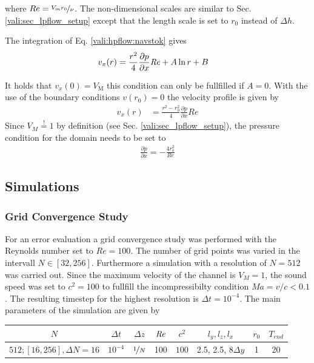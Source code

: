 where $Re = \nicefrac{V_{m}r_0}{\nu}$.
The non-dimensional scales are similar to Sec. \ref{vali:sec_lpflow_setup}  except that the length scale is set to $r_0$ instead of $\Delta h$.

The integration of Eq. \ref{vali:hpflow:navstok} gives
\begin{align}
    v_x(r) &= \frac{r^2}{4}\frac{\partial p}{\partial x}\mbox{\textit{Re}} + A \ln r + B
\end{align}

It holds that $v_x(0)= V_{\text{M}}$ this condition can only be fullfilled if $A=0$.
With the use of the boundary conditions $v(r_0) = 0$ the velocity profile is given by
\begin{align}
    v_x(r) &= \frac{r^2 - r_0^2}{4}\frac{\partial p}{\partial x}Re
\end{align}
Since $V_{M} \stackrel{!}{=} 1$ by definition (see Sec. \ref{vali:sec_lpflow_setup}),
 the pressure condition for the domain needs to be set to
\begin{align}
    \frac{\partial p}{\partial x} = -\frac{4 r_o^2}{Re}
\end{align}

\subsection{Simulations}
\label{vali:hpflow_simsetups}

\subsubsection{Grid Convergence Study}

For an error evaluation a grid convergence study was performed with the Reynolds number set to $Re=100$.
The number of grid points was varied in the intervall $N\in[32, 256]$. Furthermore a
simulation with a resolution of $N=512$ was carried out.
Since the maximum velocity of the channel is $V_{M}=1$,
the sound speed was set to $c^2 = 100$ to fullfill the incompressibilty condition $Ma = v/c < 0.1$.
The resulting timestep for the highest resolution is $\Delta t = 10^{-4}$.
The main parameters of the simulation are  given by

\begin{center}
\vspace*{0.7ex}
\begin{tabular}{c|c|c|c|c|c|c|c }
 $ N  $                   & $\Delta t$ & $\Delta z$            & $\mbox{\textit{Re}}$  & $c^2$   & $l_y, l_z, l_x$ & $r_0$ & $T_{end}$\\
\hline
 $512; [16, 256], \Delta N = 16 $& $10^{-4}$ & $\nicefrac{1}{N}$ & 100     & $100$   & 2.5, 2.5, $8\Delta y$ & 1     & 20\\
\end{tabular}
\vspace*{0.7ex}
\end{center}

